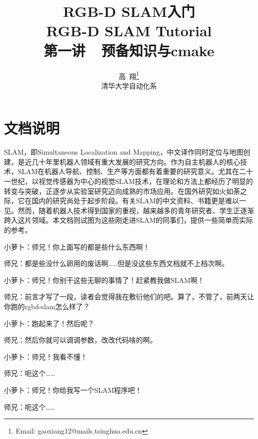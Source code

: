 \documentclass[9pt,a4paper]{article}
\begin{document}
    
\renewcommand{\contentsname}{目录}  %
\renewcommand{\abstractname}{摘要}  %
\renewcommand{\refname}{参考文献}   %
\renewcommand{\indexname}{索引}
\renewcommand{\figurename}{图}
\renewcommand{\tablename}{表}
\renewcommand{\appendixname}{附录}
    
    
\title{RGB-D SLAM入门 \\ RGB-D SLAM Tutorial \\
    第一讲~~预备知识与cmake}
\author{高~翔\footnote{Email: gaoxiang12@mails.tsinghua.edu.cn}\\[2ex]
     清华大学自动化系\\[2ex]
}
\maketitle

\section{文档说明}
SLAM，即Simultaneous Localization and Mapping，中文译作同时定位与地图创建，是近几十年里机器人领域有重大发展的研究方向。作为自主机器人的核心技术，SLAM在机器人导航、控制、生产等方面都有着重要的研究意义。尤其在二十一世纪，以视觉传感器为中心的视觉SLAM技术，在理论和方法上都经历了明显的转变与突破，正逐步从实验室研究迈向成熟的市场应用。在国外研究如火如荼之际，它在国内的研究尚处于起步阶段。有关SLAM的中文资料、书籍更是难以一见。然而，随着机器人技术得到国家的重视，越来越多的青年研究者、学生正逐渐跨入这片领域。本文档则试图为这些刚走进SLAM的同事们，提供一些简单而实际的参考。

小萝卜：师兄！你上面写的都是些什么东西啊！

师兄：都是些没什么卵用的废话啊……但是没这些东西文档就不上档次啊。

小萝卜：师兄！你别干这些无聊的事情了！赶紧教我做SLAM啊！

师兄：前言才写了一段，读者会觉得我在敷衍他们的吧。算了，不管了，前两天让你跑的rgbd-slam怎么样了？

小萝卜：跑起来了！然后呢？

师兄：然后你就可以调调参数，改改代码啥的啊。

小萝卜：师兄！我看不懂！

师兄：呃这个……

小萝卜：师兄！你给我写一个SLAM程序吧！

师兄：呃这个……
\end{document}
